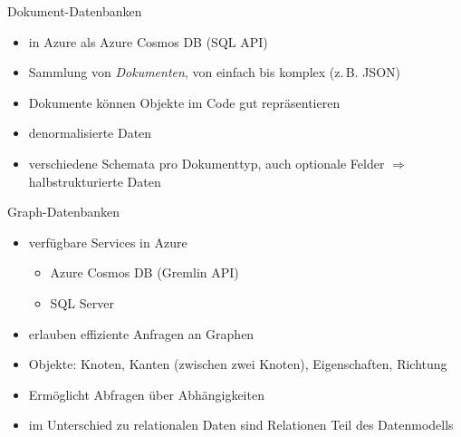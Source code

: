 \begin{flashcard}[Definition]{Dokument-Datenbanken}
  \begin{itemize}
    \item in Azure als Azure Cosmos DB (SQL API)
    \item Sammlung von \emph{Dokumenten}, von einfach bis komplex (z.\,B. JSON)
    \item Dokumente können Objekte im Code gut repräsentieren
    \item denormalisierte Daten
    \item verschiedene Schemata pro Dokumenttyp, auch optionale Felder\newline
      $\Rightarrow$ halbstrukturierte Daten
  \end{itemize}
\end{flashcard}

\begin{flashcard}[Definition]{Graph-Datenbanken}
  \begin{itemize}
    \item verfügbare Services in Azure
      \begin{itemize}
        \item Azure Cosmos DB (Gremlin API)
        \item SQL Server
      \end{itemize}
    \item erlauben effiziente Anfragen an Graphen
    \item Objekte: Knoten, Kanten (zwischen zwei Knoten), Eigenschaften, Richtung
    \item Ermöglicht Abfragen über Abhängigkeiten
    \item im Unterschied zu relationalen Daten sind Relationen Teil des Datenmodells
  \end{itemize}
\end{flashcard}

